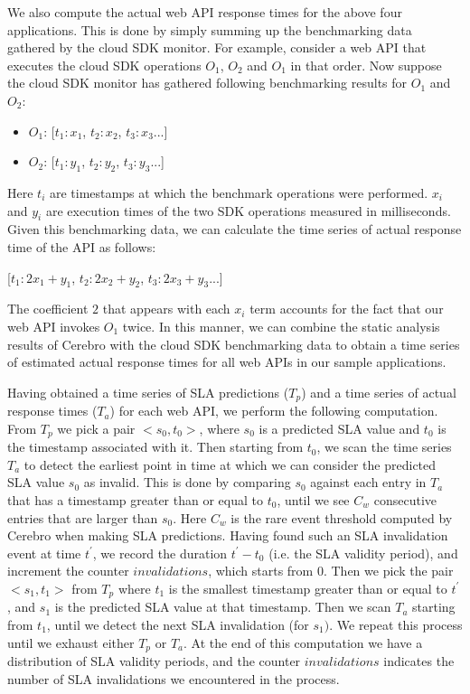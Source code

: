 We also compute the actual web API response times for the above four applications. This is done
by simply summing up the benchmarking data gathered by the cloud SDK monitor. For example,
consider a web API that executes the cloud SDK operations $O_{1}$, $O_{2}$ and $O_{1}$ in that order. 
Now suppose the cloud SDK monitor has gathered following benchmarking results for $O_{1}$ and
$O_{2}$:

\begin{itemize}
\item $O_{1}$: [$t_{1}:x_{1}$, $t_{2}:x_{2}$, $t_{3}:x_{3}$...]
\item $O_{2}$: [$t_{1}:y_{1}$, $t_{2}:y_{2}$, $t_{3}:y_{3}$...]
\end{itemize}

Here $t_{i}$ are timestamps at which the benchmark operations were performed. $x_{i}$ and $y_{i}$ are
execution times of the two SDK operations measured in milliseconds. Given this benchmarking data,
we can calculate the time series of actual response time of the API as follows:

[$t_{1}:2x_{1}+y_{1}$, $t_{2}:2x_{2}+y_{2}$, $t_{3}:2x_{3}+y_{3}$...]

The coefficient $2$ that appears with each $x_{i}$ term accounts for the fact that our web API
invokes $O_{1}$ twice. In this manner, we can combine the static analysis
results of Cerebro with the cloud SDK benchmarking data to obtain a time series of estimated
actual response times for all web APIs in our sample applications.

Having obtained a time series of SLA predictions ($T_{p}$) and a time series of actual response 
times ($T_{a}$) for each web API, we perform the following computation. From $T_{p}$ we pick a
pair $<s_{0},t_{0}>$, where $s_{0}$ is a predicted SLA value and $t_{0}$ is the timestamp associated with it. 
Then starting from $t_{0}$, we scan the time series $T_{a}$ to detect the earliest point in time
at which we can consider the predicted SLA value $s_{0}$ as invalid. This is done by comparing $s_{0}$
against each entry in $T_{a}$ that has a timestamp greater than or equal to $t_{0}$, until we see $C_{w}$ 
consecutive entries that are larger than $s_{0}$. Here $C_{w}$ is the rare event threshold 
computed by Cerebro when making SLA predictions. Having found such an SLA invalidation
event at time $t^{\prime}$, we record the duration $t^{\prime} - t_{0}$ (i.e. the SLA validity period), and 
increment the counter $invalidations$, 
which starts from $0$. Then we pick the pair $<s_{1},t_{1}>$ from $T_{p}$ where $t_{1}$ is the smallest
timestamp greater than or equal to $t^{\prime}$, and $s_{1}$ is the predicted SLA value at that timestamp.
Then we scan $T_{a}$ starting from $t_{1}$, until we detect the next SLA invalidation (for $s_{1})$. 
We repeat this process
until we exhaust either $T_{p}$ or $T_{a}$. At the end of this computation we have a distribution of SLA
validity periods, and the counter $invalidations$ indicates the number of SLA invalidations we encountered
in the process.

